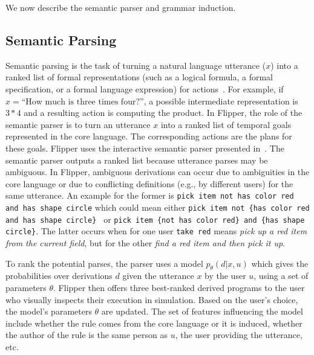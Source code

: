\documentclass[letterpaper, 10 pt, conference]{ieeeconf}  %
\newcommand{\tool}{Flipper\xspace}
\begin{document}
We now describe the semantic parser and grammar induction.
%


\subsection{Semantic Parsing}
Semantic parsing
is the task of turning a natural language utterance ($x$) into a
ranked list of formal representations (such as a logical formula, a formal specification, or a
formal language expression) for actions~\cite{liangSemanticParsers}.
For example, if $x = \text{``How much is three times four?''}$,
a possible intermediate representation is $3*4$ and a
resulting action is computing the product.
In \tool, the role of the semantic parser is to turn an utterance $x$
into a ranked list of temporal goals represented in the core language.
The corresponding actions are the plans for these goals.
\tool uses the interactive semantic parser presented in~\cite{wangVoxelurn}.
The semantic parser outputs a ranked list because utterance parses may be ambiguous.
In \tool, ambiguous derivations can occur
due to ambiguities in the core language
or due to conflicting definitions (e.g., by different users) for the same utterance.
An example for the former is \lstinline{pick item not has color red and has shape circle}
which could mean either
\lstinline |pick item not {has color red and has shape circle} | or \lstinline |pick item {not has color red} and {has shape circle}|.
The latter occurs when for one user
\lstinline{take red} means \textit{pick up a red item from the
current field}, but for the other \textit{find a red item and then pick it up}.

To rank the potential parses, the parser uses a model $p_\theta(d | x, u)$
which gives the probabilities over derivations $d$ given the utterance $x$ by the user $u$,
using a set of parameters $\theta$.
\tool then offers three best-ranked derived programs to the user who
visually inspects their execution in simulation.
Based on the user's choice, the model's parameters $\theta$ are updated.
The set of features influencing the
model include whether the rule comes from the core language or it is induced,
whether the author of the rule is the same person as $u$, the user providing the
utterance, etc.
\end{document}
